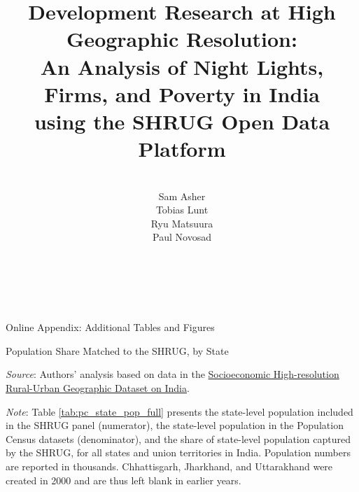 \documentclass[12pt,letterpaper]{article}
\title{Development Research at High Geographic Resolution: \\ An
  Analysis of Night Lights, Firms, and Poverty in India \\ using the
  SHRUG Open Data Platform}
\author{ \\ Sam Asher \\ Tobias Lunt \\ Ryu Matsuura \\ Paul Novosad \\ }
\begin{document}
\date{}
\maketitle \\ \\

\begin{center}
{\large Online Appendix: Additional Tables and Figures}
\end{center}

\begin{appendix}


\clearpage
\setcounter{pag}{1} \doublespacing

\setcounter{table}{0}
\renewcommand{\thetable}{S\arabic{table}}
\setcounter{figure}{0}
\renewcommand{\thefigure}{S\arabic{figure}}


  \begin{table}[H]
    \caption{Population Share Matched to the SHRUG, by State} 
    \vspace{-5mm}

    \begin{center}
      \tiny{}
    \end{center}

    \footnotesize \item \textit{Source}: Authors' analysis based on data in the \href{http://www.devdatalab.org/shrug}{Socioeconomic High-resolution
    Rural-Urban Geographic Dataset on India}.
     \item \textit{Note}: Table \ref{tab:pc_state_pop_full} presents the state-level
       population included in the SHRUG panel (numerator), the
       state-level population in the Population Census datasets
       (denominator), and the share of state-level population captured
       by the SHRUG, for all states and union territories in
       India. Population numbers are reported in
       thousands. Chhattisgarh, Jharkhand, and Uttarakhand were
       created in 2000 and are thus left blank in earlier years.

    \label{tab:pc_state_pop_full}
  \end{table}


\end{appendix}
\end{document}
